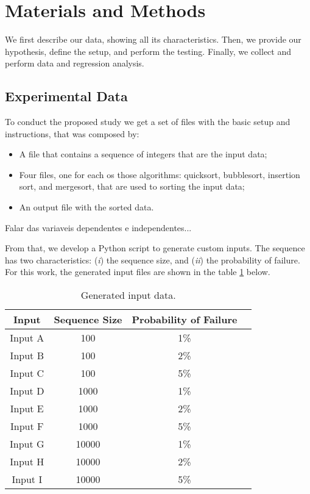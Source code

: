 \section{Materials and Methods}

We first describe our data, showing all its characteristics. Then, we provide our hypothesis, define the setup, and perform the testing. Finally, we collect and perform data and regression analysis.

\subsection{Experimental Data}

To conduct the proposed study we get a set of files with the basic setup and instructions, that was composed by:
\begin{itemize}
    \item A file that contains a sequence of integers that are the input data;
    \item Four files, one for each os those algorithms: quicksort, bubblesort, insertion sort, and mergesort, that are used to sorting the input data;
    \item An output file with the sorted data.
\end{itemize}

Falar das variaveis dependentes e independentes...

From that, we develop a Python script to generate custom inputs. The sequence has two characteristics: (\textit{i}) the sequence size, and (\textit{ii}) the probability of failure. For this work, the generated input files are shown in the table \ref{table2} below.

\begin{table}[htbp]
    \caption{Generated input data.}
    \begin{center}
    \begin{tabular}{|c|c|c|c|}
    \hline
    \multirow{1}{*}{\textbf{Input}}&\textbf{Sequence Size}&\textbf{Probability of Failure} \\
    \hline
    Input A & 100 & 1\% \\
    Input B & 100 & 2\% \\
    Input C & 100 & 5\% \\
    \hline
    Input D & 1000 & 1\% \\
    Input E & 1000 & 2\% \\
    Input F & 1000 & 5\% \\
    \hline
    Input G & 10000 & 1\% \\
    Input H & 10000 & 2\% \\
    Input I & 10000 & 5\% \\
    \hline
    \end{tabular}
    \label{table2}
    \end{center}
\end{table}


